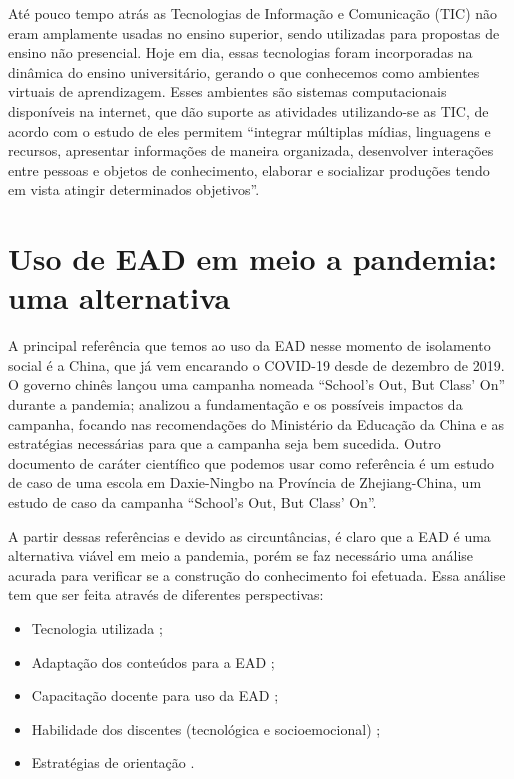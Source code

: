 \documentclass[
	arial,
	12pt,				%
	openright,			%
	twoside,			%
	a4paper,			%
	chapter=TITLE,		%
	english,			%
	french,				%
	spanish,			%
	brazil,				%
	]{abntex2}
\begin{document}
Até pouco tempo atrás as Tecnologias de Informação e Comunicação (TIC) não eram amplamente usadas no ensino superior, sendo utilizadas para propostas de ensino não presencial. Hoje em dia, essas tecnologias foram incorporadas na dinâmica do ensino universitário, gerando o que conhecemos como ambientes virtuais de aprendizagem. Esses ambientes são sistemas computacionais disponíveis na internet, que dão suporte as atividades utilizando-se as TIC, de acordo com o estudo de  eles permitem ``integrar múltiplas mídias, linguagens e recursos, apresentar informações de maneira organizada, desenvolver interações entre pessoas e objetos de conhecimento, elaborar e socializar produções tendo em vista atingir determinados objetivos''.


\section{Uso de EAD em meio a pandemia: uma alternativa}

A principal referência que temos ao uso da EAD nesse momento de isolamento social é a China, que já vem encarando o COVID-19 desde de dezembro de 2019. O governo chinês lançou uma campanha nomeada ``School’s Out, But Class’ On'' durante a pandemia;  analizou a fundamentação e os possíveis impactos da campanha, focando nas recomendações do Ministério da Educação da China e as estratégias necessárias para que a campanha seja bem sucedida. Outro documento de caráter científico que podemos usar como referência é um estudo de caso de uma escola em Daxie-Ningbo na Província de Zhejiang-China, um estudo de caso da campanha ``School’s Out, But Class’ On''.

A partir dessas referências e devido as circuntâncias, é claro que a EAD é uma alternativa viável em meio a pandemia, porém se faz necessário uma análise acurada para verificar se a construção do conhecimento foi efetuada. Essa análise tem que ser feita através de diferentes perspectivas:

 \begin{itemize}

  \item Tecnologia utilizada \cite{benakouche2000educaccao, almeida2003educaccao, georgia};
  \item Adaptação dos conteúdos para a EAD \cite{xie2020autonomous, zhou2020school, benakouche2000educaccao};
  \item Capacitação docente para uso da EAD \cite{benakouche2000educaccao};
  \item Habilidade dos discentes (tecnológica e socioemocional) \cite{oranburg2020distance, arieira2009avaliaccao};
  \item Estratégias de orientação \cite{xie2020autonomous, reich2020remote, zhou2020school}.

\end{itemize}
\end{document}
